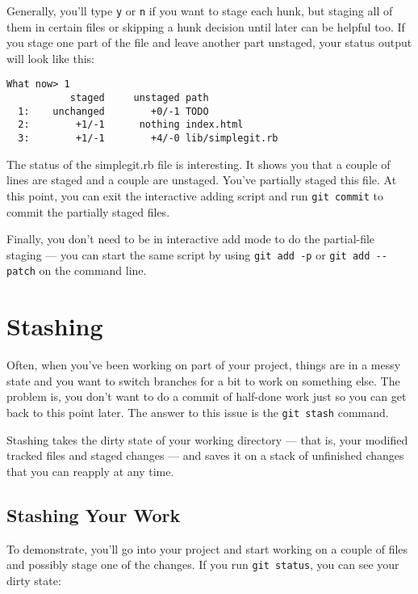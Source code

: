 \documentclass[a4paper]{book}
\begin{document}
Generally, you'll type \texttt{y} or \texttt{n} if you want to stage each hunk, but staging all of them in certain files or skipping a hunk decision until later can be helpful too. If you stage one part of the file and leave another part unstaged, your status output will look like this:

\begin{shaded}\begin{verbatim}
What now> 1
           staged     unstaged path
  1:    unchanged        +0/-1 TODO
  2:        +1/-1      nothing index.html
  3:        +1/-1        +4/-0 lib/simplegit.rb
\end{verbatim}\end{shaded}

The status of the simplegit.rb file is interesting. It shows you that a couple of lines are staged and a couple are unstaged. You've partially staged this file. At this point, you can exit the interactive adding script and run \texttt{git commit} to commit the partially staged files.

Finally, you don't need to be in interactive add mode to do the partial-file staging --- you can start the same script by using \texttt{git add -p} or \texttt{git add -{}-patch} on the command line.

\section{Stashing}\label{stashing}

Often, when you've been working on part of your project, things are in a messy state and you want to switch branches for a bit to work on something else. The problem is, you don't want to do a commit of half-done work just so you can get back to this point later. The answer to this issue is the \texttt{git stash} command.

Stashing takes the dirty state of your working directory --- that is, your modified tracked files and staged changes --- and saves it on a stack of unfinished changes that you can reapply at any time.

\subsection{Stashing Your Work}\label{stashing-your-work}

To demonstrate, you'll go into your project and start working on a couple of files and possibly stage one of the changes. If you run \texttt{git status}, you can see your dirty state:
\end{document}
